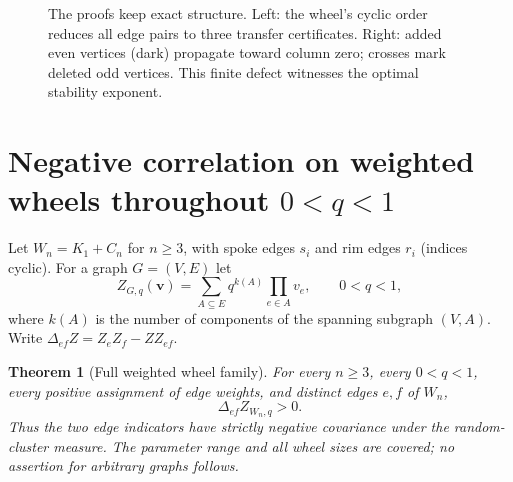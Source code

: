 \documentclass[11pt,a4paper]{article}
\newtheorem{theorem}{Theorem}[section]
\theoremstyle{definition}
\theoremstyle{remark}\newtheorem{remark}[theorem]{Remark}
\begin{document}
\clearpage
\begin{figure}[!ht]
\centering
\begin{minipage}{.45\textwidth}\centering
{}
\end{minipage}\hfill
\begin{minipage}{.5\textwidth}\centering
{}
\end{minipage}
\caption{The proofs keep exact structure. Left: the wheel's cyclic order
reduces all edge pairs to three transfer certificates. Right: added even
vertices (dark) propagate toward column zero; crosses mark deleted odd
vertices. This finite defect witnesses the optimal stability exponent.}
\end{figure}
\section{Negative correlation on weighted wheels throughout \texorpdfstring{$0<q<1$}{0 < q < 1}}
\label{sec:wheel}
Let $W_n=K_1+C_n$ for $n\ge3$, with spoke edges $s_i$ and rim edges $r_i$ (indices cyclic). For a graph $G=(V,E)$ let
\[
 Z_{G,q}(\boldsymbol v)=\sum_{A\subseteq E}q^{k(A)}\prod_{e\in A}v_e,
 \qquad 0<q<1,
\]
where $k(A)$ is the number of components of the spanning subgraph $(V,A)$. Write $\Delta_{ef}Z=Z_eZ_f-ZZ_{ef}$.
\begin{theorem}[Full weighted wheel family]
\label{thm:wheel}
For every $n\ge3$, every $0<q<1$, every positive assignment of edge weights, and distinct edges $e,f$ of $W_n$,
\[
 \Delta_{ef}Z_{W_n,q}>0.
\]
Thus the two edge indicators have strictly negative covariance under the random-cluster measure. The parameter range and all wheel sizes are covered; no assertion for arbitrary graphs follows.
\end{theorem}
\end{document}
